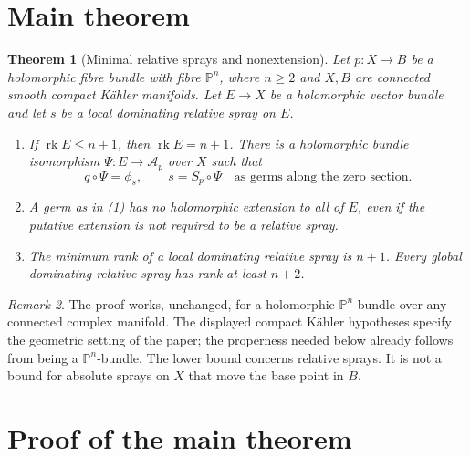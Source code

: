 \documentclass[12pt]{amsart}
\newtheorem{thm}{Theorem}[section]
\theoremstyle{definition}
\theoremstyle{remark}
\newtheorem{rem}[thm]{Remark}
\numberwithin{equation}{section}
\newcommand{\rk}{\operatorname{rk}}
\newcommand{\cA}{\mathcal{A}}
\newcommand{\mP}{\mathbb{P}}
\begin{document}
\section{Main theorem}\label{en:mainsection}
\begin{thm}[Minimal relative sprays and nonextension]\label{en:main}
Let $p:X\to B$ be a holomorphic fibre bundle with fibre $\mP^n$, where $n\geq2$ and $X,B$ are connected smooth compact K\"ahler manifolds. Let $E\to X$ be a holomorphic vector bundle and let $s$ be a local dominating relative spray on $E$.
\begin{enumerate}
\item If $\rk E\leq n+1$, then $\rk E=n+1$. There is a holomorphic bundle isomorphism $\Psi:E\to\cA_p$ over $X$ such that
\[
q\circ\Psi=\phi_s,\qquad s=S_p\circ\Psi
\quad\text{as germs along the zero section.}
\]
\item A germ as in (1) has no holomorphic extension to all of $E$, even if the putative extension is not required to be a relative spray.
\item The minimum rank of a local dominating relative spray is $n+1$. Every global dominating relative spray has rank at least $n+2$.
\end{enumerate}
\end{thm}

\begin{rem}\label{en:scope}
The proof works, unchanged, for a holomorphic $\mP^n$-bundle over any connected complex manifold. The displayed compact K\"ahler hypotheses specify the geometric setting of the paper; the properness needed below already follows from being a $\mP^n$-bundle. The lower bound concerns relative sprays. It is not a bound for absolute sprays on $X$ that move the base point in $B$.
\end{rem}

\section{Proof of the main theorem}
\end{document}
